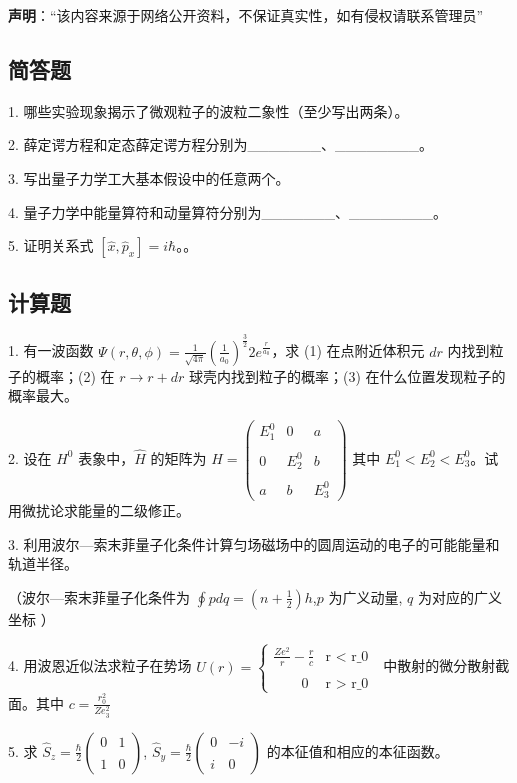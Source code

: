 
\textbf{声明}：“该内容来源于网络公开资料，不保证真实性，如有侵权请联系管理员”

\subsection{简答题}

1. 哪些实验现象揭示了微观粒子的波粒二象性（至少写出两条）。

2. 薛定谔方程和定态薛定谔方程分别为_______、________。

3. 写出量子力学工大基本假设中的任意两个。

4. 量子力学中能量算符和动量算符分别为_______、________。

5. 证明关系式 $[\hat{x}, \hat{p}_x] = i\hbar$。。

\subsection{计算题}

1. 有一波函数 $\Psi(r, \theta, \phi) = \frac{1}{\sqrt{4 \pi}} \left( \frac{1}{a_0} \right)^{\frac{3}{2}} 2 e^{\frac{r}{a_0}}$，求 (1) 在点附近体积元 $dr$ 内找到粒子的概率；(2) 在 $r \to r + dr$ 球壳内找到粒子的概率；(3) 在什么位置发现粒子的概率最大。

2. 设在 $H^0$ 表象中，$\hat{H}$ 的矩阵为
$\hat{H} = \begin{pmatrix}E_1^0 & 0 & a \\\\0 & E_2^0 & b \\\\a & b & E_3^0\end{pmatrix}$
其中 $E_1^0 < E_2^0 < E_3^0$。试用微扰论求能量的二级修正。

3. 利用波尔—索末菲量子化条件计算匀场磁场中的圆周运动的电子的可能能量和轨道半径。

（波尔—索末菲量子化条件为 $\oint p dq = (n + \frac{1}{2}) h$,$p$ 为广义动量, $q$ 为对应的广义坐标 ）

4. 用波恩近似法求粒子在势场 $U(r) = \begin{cases} 
\frac{Ze^2}{r} - \frac{r}{c} & \text {r < r_0 }\\\\
\qquad0 & \text{r > r_0 }
\end{cases}$ 中散射的微分散射截面。其中
$c = \frac{r_0^2}{Ze_3^2}$

5. 求 $\hat{S}_z = \frac{\hbar}{2} \begin{pmatrix}
0 & 1 \\\\
1 & 0
\end{pmatrix}$, $\hat{S}_y = \frac{\hbar}{2} \begin{pmatrix}
0 & -i \\\\
i & 0
\end{pmatrix}$ 的本征值和相应的本征函数。

